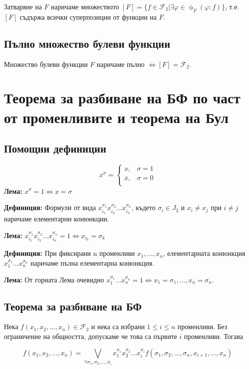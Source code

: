 \documentclass[fleqn,12pt]{article}
\begin{document}
\begin{flushleft}
Затваряне на $F$ наричаме множеството $[F] = \{ f \in \mathcal{F}_2 | \exists \varphi \in \upphi_F (\varphi : f) \}$, т.е. $[F]$ съдържа всички суперпозиции от функции на $F$.

\subsection{Пълно множество булеви функции}
Множество булеви функции $F$ наричаме пълно $\Leftrightarrow [F] = \mathcal{F}_2$.

\section{Теорема за разбиване на БФ по част от променливите и теорема на Бул}

\subsection{Помощни дефиниции}
\[ x^\sigma = \begin{cases}
    x, & \sigma = 1 \\
    \overline{x}, & \sigma = 0 \\
\end{cases}\]
\textbf{Лема: } $x^\sigma = 1 \Leftrightarrow x = \sigma$

\textbf{Дефиниция: } Формули от вида $x_{i_1}^{\sigma_1} x_{i_2}^{\sigma_2} \dots x_{i_n}^{\sigma_n}$, където
$\sigma_i \in J_2$ и $x_i \neq x_j$ при $i \neq j$ наричаме елементарни конюнкции.

\textbf{Лема: } $x_{i_1}^{\sigma_1} x_{i_2}^{\sigma_2} \dots x_{i_n}^{\sigma_n} = 1 \Leftrightarrow x_{i_k} = \sigma_k$
\bigbreak 

\textbf{Дефиниция: } При фиксирани n променливи $x_1, \dots, x_n$, елементарната конюнкция $x_1^{\sigma_1} \dots x_n^{\sigma_n}$ наричаме пълна елементарна конюнкция.

\textbf{Лема: } От горната Лема очевидно $x_1^{\sigma_1} \dots x_n^{\sigma_n} = 1 \iff x_1 = \sigma_1, \dots, x_n = \sigma_n$. 

\subsection{Теорема за разбиване на БФ}
Нека $f(x_1, x_2, \dots, x_n) \in \mathcal{F}_2$ и нека са избрани $1 \leq i \leq n$ променливи.
Без ограничение на общността, допускаме че това са първите $i$ променливи. Тогава

\[ f(x_1, x_2, \dots, x_n) = \bigvee_{\forall \sigma_1, \sigma_2, \dots, \sigma_i} x_1^{\sigma_1} x_2^{\sigma_2} \dots x_i^{\sigma_i} f(\sigma_1, \sigma_2, \dots, \sigma_n, x_{i+1}, \dots, x_n) \]


\end{flushleft}
\end{document}
